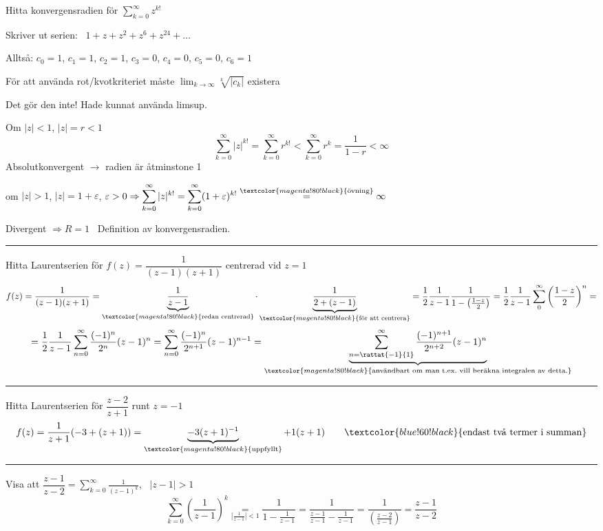  \quad Hitta konvergensradien för $\displaystyle\sum_{k = 0}^\infty z^{k!}$

\textcolor{blue!60!black}{Skriver ut serien:} \ $1 + z + z^2 + z^6 + z^{24} + \dots$

Alltså: $c_0 = 1$, $c_1 = 1$, $c_2 = 1$, $c_3 = 0$, $c_4 = 0$, $c_5 = 0$, $c_6 = 1$

För att använda rot/kvotkriteriet måste $\displaystyle\lim_{k \to \infty} \sqrt[k]{|c_k|}$ existera

Det gör den inte! \textcolor{blue!60!black}{Hade kunnat använda limsup.}

Om $|z| < 1$, $|z| = r < 1$
\[ \sum_{k = 0}^\infty |z|^{k!} = \sum_{k = 0}^\infty r^{k!} < \sum_{k = 0}^\infty r^k = \frac{1}{1 - r} < \infty \]
\textcolor{blue!60!black}{Absolutkonvergent $\to$ radien är åtminstone 1}

om $|z| > 1$, $|z| = 1 + \varepsilon$, $\varepsilon > 0 \Rightarrow \displaystyle\sum_{k = 0}^\infty |z|^{k!} = \sum_{k = 0}^\infty (1 + \varepsilon)^{k!} \overset{\textcolor{magenta!80!black}{\text{övning}}}{=} \infty$

\textcolor{blue!60!black}{Divergent} $\Rightarrow R = 1$ \ \textcolor{blue!60!black}{Definition av konvergensradien.}

\noindent\rule{\linewidth}{0.4pt}

 \quad Hitta Laurentserien för $f(z) = \dfrac{1}{(z - 1)(z + 1)}$ centrerad vid $z = 1$
\[ f(z) = \frac{1}{(z - 1)(z + 1)} = \underbrace{\frac{1}{z - 1}}_{\textcolor{magenta!80!black}{\text{redan centrerad}}} \cdot \underbrace{\frac{1}{2 + (z - 1)}}_{\textcolor{magenta!80!black}{\text{för att centrera}}} = \frac{1}{2} \frac{1}{z - 1} \frac{1}{1 - \left( \frac{1 - z}{2} \right)} = \frac{1}{2} \frac{1}{z - 1} \sum_0^\infty \left( \frac{1 - z}{2} \right)^n = \]
\[ = \frac{1}{2} \frac{1}{z - 1} \sum_{n = 0}^\infty \frac{(-1)^n}{2^n}(z - 1)^n = \sum_{n = 0}^\infty \frac{(-1)^n}{2^{n+1}}(z - 1)^{n-1} = \underbrace{\sum_{n = \rattat{-1}{1}}^\infty \frac{(-1)^{n+1}}{2^{n+2}}(z - 1)^n}_{\textcolor{magenta!80!black}{\text{användbart om man t.ex.\ vill beräkna integralen av detta.}}} \]

\noindent\rule{\linewidth}{0.4pt}

 \quad Hitta Laurentserien för $\dfrac{z - 2}{z + 1}$ runt $z = -1$
\[ f(z) = \frac{1}{z + 1}(-3 + (z + 1)) = \underbrace{-3(z + 1)^{-1}}_{\textcolor{magenta!80!black}{\text{uppfyllt}}} + 1(z + 1) \qquad \textcolor{blue!60!black}{\text{endast två termer i summan}} \]

\noindent\rule{\linewidth}{0.4pt}

 \quad Visa att $\dfrac{z - 1}{z - 2} = \displaystyle\sum_{k = 0}^\infty \frac{1}{(z - 1)^k}$, \ $|z - 1| > 1$
\[ \sum_{k = 0}^\infty \left( \frac{1}{z - 1} \right)^k \underset{\left| \frac{1}{z - 1} \right| < 1}{=} \frac{1}{1 - \frac{1}{z - 1}} = \frac{1}{\frac{z - 1}{z - 1} - \frac{1}{z - 1}} = \frac{1}{\left( \frac{z - 2}{z - 1} \right)} = \frac{z - 1}{z - 2} \]
